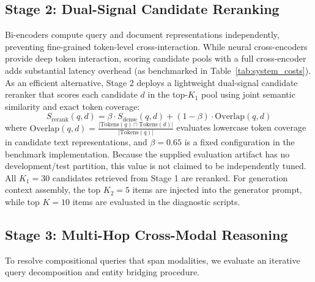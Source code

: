\documentclass[conference]{IEEEtran}
\begin{document}
\subsection{Stage 2: Dual-Signal Candidate Reranking}
Bi-encoders compute query and document representations independently, preventing fine-grained token-level cross-interaction. While neural cross-encoders provide deep token interaction, scoring candidate pools with a full cross-encoder adds substantial latency overhead (as benchmarked in Table~\ref{tab:system_costs}). As an efficient alternative, Stage 2 deploys a lightweight dual-signal candidate reranker that scores each candidate $d$ in the top-$K_1$ pool using joint semantic similarity and exact token coverage:
\begin{equation}
    S_{\text{rerank}}(q, d) = \beta \cdot S_{\text{dense}}(q, d) + (1 - \beta) \cdot \text{Overlap}(q, d)
\end{equation}
where $\text{Overlap}(q, d) = \frac{|\text{Tokens}(q) \cap \text{Tokens}(d)|}{|\text{Tokens}(q)|}$ evaluates lowercase token coverage in candidate text representations, and $\beta = 0.65$ is a fixed configuration in the benchmark implementation. Because the supplied evaluation artifact has no development/test partition, this value is not claimed to be independently tuned. All $K_1 = 30$ candidates retrieved from Stage 1 are reranked. For generation context assembly, the top $K_2 = 5$ items are injected into the generator prompt, while top $K = 10$ items are evaluated in the diagnostic scripts.

\subsection{Stage 3: Multi-Hop Cross-Modal Reasoning}
To resolve compositional queries that span modalities, we evaluate an iterative query decomposition and entity bridging procedure.
\end{document}
